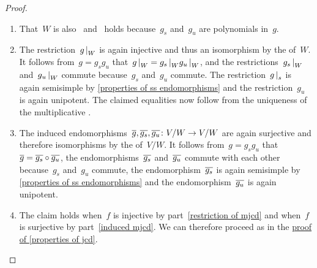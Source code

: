 \begin{proof}
  \leavevmode
  \begin{enumerate}
    \item
      That~$W$ is also~ and~ holds because~$g_s$ and~$g_u$ are polynomials in~$g$.
    \item
      The restriction~$\restrict{g}{W}$ is again injective and thus an isomorphism by the  of~$W$.
      It follows from~$g = g_s g_u$ that~$\restrict{g}{W} = \restrict{g_s}{W} \restrict{g_u}{W}$, and the restrictions~$\restrict{g_s}{W}$ and~$\restrict{g_u}{W}$ commute because~$g_s$ and~$g_u$ commute.
      The restriction~$\restrict{g}{s}$ is again semisimple by \cref{properties of ss endomorphisms} and the restriction~$g_u$ is again unipotent.
      The claimed equalities now follow from the uniqueness of the multiplicative {\JCD}.
    \item
      The induced endomorphisms~$\overline{g}, \overline{g_s}, \overline{g_u} \colon V/W \to V/W$ are again surjective and therefore isomorphisms by the  of~$V/W$.
      It follows from~$g = g_s g_u$ that~$\overline{g} = \overline{g_s} \circ \overline{g_u}$, the endomorphisms~$\overline{g_s}$ and~$\overline{g_u}$ commute with each other because~$g_s$ and~$g_u$ commute, the endomorphism~$\overline{g_s}$ is again semisimple by \cref{properties of ss endomorphisms} and the endomorphism~$\overline{g_u}$ is again unipotent.
    \item
      The claim holds when~$f$ is injective by part~\ref*{restriction of mjcd} and when~$f$ is surjective by part~\ref*{induced mjcd}.
      We can therefore proceed as in the \hyperref[properties of jcd proof]{proof of \cref{properties of jcd}}.
    \qedhere
  \end{enumerate}
\end{proof}




